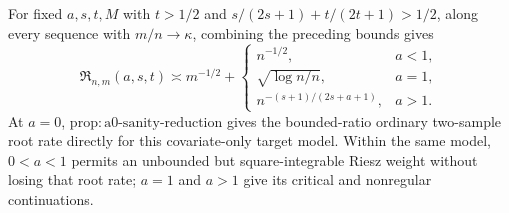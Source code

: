 For fixed \(a,s,t,M\) with \(t>1/2\) and \(s/(2s+1)+t/(2t+1)>1/2\), along every sequence with \(m/n\to\kappa\), combining the preceding bounds gives \[\mathfrak R_{n,m}(a,s,t)\asymp m^{-1/2}+\begin{cases}n^{-1/2},&a<1,\\ \sqrt{\log n/n},&a=1,\\ n^{-(s+1)/(2s+a+1)},&a>1.\end{cases}\] At \(a=0\), \(\mathrm{prop:a0\text{-}sanity\text{-}reduction}\) gives the bounded-ratio ordinary two-sample root rate directly for this covariate-only target model. Within the same model, \(0<a<1\) permits an unbounded but square-integrable Riesz weight without losing that root rate; \(a=1\) and \(a>1\) give its critical and nonregular continuations.
